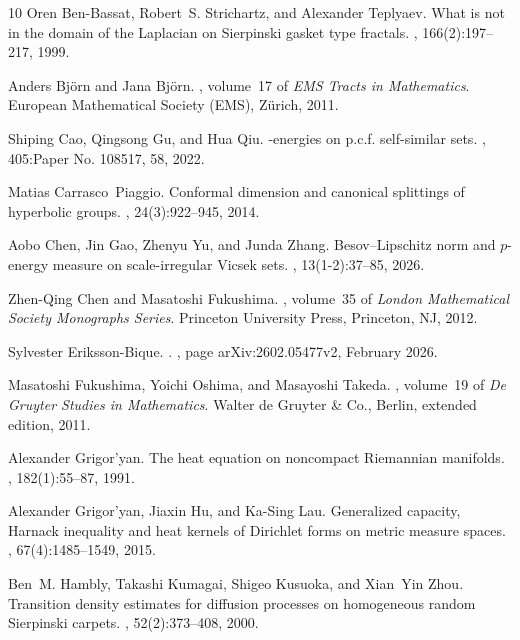 \documentclass[11pt,a4paper]{article}
\numberwithin{equation}{section}
\theoremstyle{plain}
\theoremstyle{definition}
\begin{document}
\begin{thebibliography}{10}
Oren Ben-Bassat, Robert~S. Strichartz, and Alexander Teplyaev.
\newblock What is not in the domain of the {L}aplacian on {S}ierpinski gasket
  type fractals.
, 166(2):197--217, 1999.

Anders Bj\"orn and Jana Bj\"orn.
, volume~17 of {\em
  EMS Tracts in Mathematics}.
\newblock European Mathematical Society (EMS), Z\"urich, 2011.

Shiping Cao, Qingsong Gu, and Hua Qiu.
-energies on p.c.f. self-similar sets.
, 405:Paper No. 108517, 58, 2022.

Matias Carrasco~Piaggio.
\newblock Conformal dimension and canonical splittings of hyperbolic groups.
, 24(3):922--945, 2014.

Aobo Chen, Jin Gao, Zhenyu Yu, and Junda Zhang.
\newblock Besov--{L}ipschitz norm and {$p$}-energy measure on scale-irregular
  {V}icsek sets.
, 13(1-2):37--85, 2026.

Zhen-Qing Chen and Masatoshi Fukushima.
,
  volume~35 of {\em London Mathematical Society Monographs Series}.
\newblock Princeton University Press, Princeton, NJ, 2012.

Sylvester {Eriksson-Bique}.
.
, page arXiv:2602.05477v2, February 2026.

Masatoshi Fukushima, Yoichi Oshima, and Masayoshi Takeda.
, volume~19 of
  {\em De Gruyter Studies in Mathematics}.
\newblock Walter de Gruyter \& Co., Berlin, extended edition, 2011.

Alexander Grigor'yan.
\newblock The heat equation on noncompact {R}iemannian manifolds.
, 182(1):55--87, 1991.

Alexander Grigor'yan, Jiaxin Hu, and Ka-Sing Lau.
\newblock Generalized capacity, {H}arnack inequality and heat kernels of
  {D}irichlet forms on metric measure spaces.
, 67(4):1485--1549, 2015.

Ben~M. Hambly, Takashi Kumagai, Shigeo Kusuoka, and Xian~Yin Zhou.
\newblock Transition density estimates for diffusion processes on homogeneous
  random {S}ierpinski carpets.
, 52(2):373--408, 2000.


\end{thebibliography}
\end{document}
